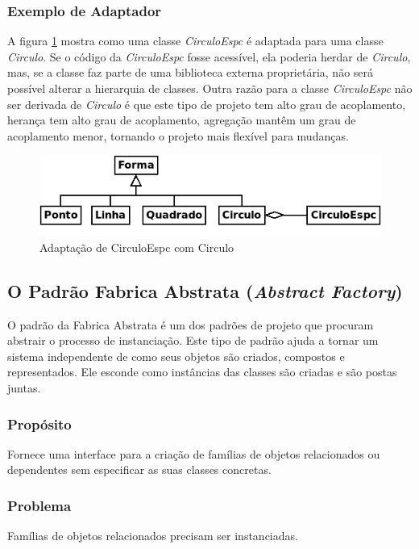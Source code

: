 \documentclass[
	11pt,				%
	openright,
	twoside,			%
	a4paper,			%
	english,			%
	french,
	brazil,				%
	sumario=tradicional
	]{abntex2}
\begin{document}
\subsubsection{Exemplo de Adaptador}
A figura \ref{fig:adaptCirc} mostra como uma classe \emph{CirculoEspc} é adaptada para uma classe \emph{Circulo}. Se o código da \emph{CirculoEspc} fosse acessível, ela poderia herdar de \emph{Circulo}, mas, se a classe faz parte de uma biblioteca externa proprietária, não será possível alterar a hierarquia de classes. Outra razão para a classe \emph{CirculoEspc} não ser derivada de \emph{Circulo} é que este tipo de projeto tem alto grau de acoplamento, herança tem alto grau de acoplamento, agregação mantêm um grau de acoplamento menor, tornando o projeto mais flexível para mudanças. 

\begin{figure}[h]
\begin{center}
\includegraphics[scale=0.5]{adaptCirc.png}
\caption{Adaptação de CirculoEspc com Circulo}\label{fig:adaptCirc}
\end{center}
\end{figure}


\subsection{O Padrão Fabrica Abstrata (\textit{Abstract Factory})}

O padrão da Fabrica Abstrata é um dos padrões de projeto que procuram abstrair o processo de instanciação. Este tipo de padrão ajuda a tornar um sistema independente de como seus objetos são criados, compostos e representados. Ele esconde como instâncias das classes são criadas e são postas juntas.

\subsubsection{Propósito}
Fornece uma interface para a criação de famílias de objetos relacionados ou dependentes sem especificar as suas classes concretas.

\subsubsection{Problema}
Famílias de objetos relacionados precisam ser instanciadas.
\end{document}
